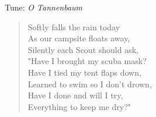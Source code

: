 
Tune: \textit{O Tannenbaum} \\

\begin{verse}
Softly falls the rain today \\

As our campsite floats away, \\

Silently each Scout should ask, \\

"Have I brought my scuba mask? \\

Have I tied my tent flaps down, \\

Learned to swim so I don't drown, \\

Have I done and will I try, \\

Everything to keep me dry?" \\
\end{verse}
